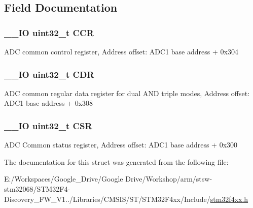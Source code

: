 \subsection{Field Documentation}
\hypertarget{struct_a_d_c___common___type_def_a5e1322e27c40bf91d172f9673f205c97}{
\subsubsection[{C\-C\-R}]{\setlength{\rightskip}{0pt plus 5cm}\-\_\-\-\_\-\-I\-O uint32\-\_\-t C\-C\-R}}\label{struct_a_d_c___common___type_def_a5e1322e27c40bf91d172f9673f205c97}
A\-D\-C common control register, Address offset\-: A\-D\-C1 base address + 0x304 \hypertarget{struct_a_d_c___common___type_def_a760f86a1a18dffffda54fc15a977979f}{
\subsubsection[{C\-D\-R}]{\setlength{\rightskip}{0pt plus 5cm}\-\_\-\-\_\-\-I\-O uint32\-\_\-t C\-D\-R}}\label{struct_a_d_c___common___type_def_a760f86a1a18dffffda54fc15a977979f}
A\-D\-C common regular data register for dual A\-N\-D triple modes, Address offset\-: A\-D\-C1 base address + 0x308 \hypertarget{struct_a_d_c___common___type_def_a876dd0a8546697065f406b7543e27af2}{
\subsubsection[{C\-S\-R}]{\setlength{\rightskip}{0pt plus 5cm}\-\_\-\-\_\-\-I\-O uint32\-\_\-t C\-S\-R}}\label{struct_a_d_c___common___type_def_a876dd0a8546697065f406b7543e27af2}
A\-D\-C Common status register, Address offset\-: A\-D\-C1 base address + 0x300 

The documentation for this struct was generated from the following file\-:\begin{DoxyCompactItemize}
\item 
E\-:/\-Workspaces/\-Google\-\_\-\-Drive/\-Google Drive/\-Workshop/arm/stsw-\/stm32068/\-S\-T\-M32\-F4-\/\-Discovery\-\_\-\-F\-W\-\_\-\-V1../\-Libraries/\-C\-M\-S\-I\-S/\-S\-T/\-S\-T\-M32\-F4xx/\-Include/\hyperlink{stm32f4xx_8h}{stm32f4xx.\-h}\end{DoxyCompactItemize}
